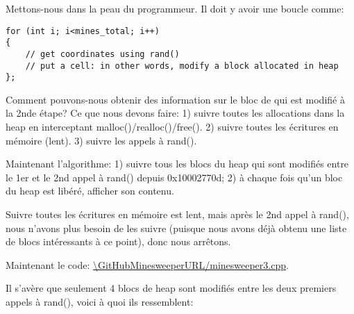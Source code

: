 Mettons-nous dans la peau du programmeur.
Il doit y avoir une boucle comme:

\begin{lstlisting}
for (int i; i<mines_total; i++)
{
	// get coordinates using rand()
	// put a cell: in other words, modify a block allocated in heap
};
\end{lstlisting}

Comment pouvons-nous obtenir des information sur le bloc de qui est modifié à la
2nde étape?
Ce que nous devons faire:
1) suivre toutes les allocations dans la heap en interceptant malloc()/realloc()/free().
2) suivre toutes les écritures en mémoire (lent).
3) suivre les appels à rand().

Maintenant l'algorithme:
1) suivre tous les blocs du heap qui sont modifiés entre le 1er et le 2nd appel à
rand() depuis 0x10002770d;
2) à chaque fois qu'un bloc du heap est libéré, afficher son contenu.

Suivre toutes les écritures en mémoire est lent, mais après le 2nd appel à rand(),
nous n'avons plus besoin de les suivre (puisque nous avons déjà obtenu une liste
de blocs intéressants à ce point), donc nous arrêtons.

Maintenant le code: \url{\GitHubMinesweeperURL/minesweeper3.cpp}.

Il s'avère que seulement 4 blocs de heap sont modifiés entre les deux premiers appels
à rand(), voici à quoi ils ressemblent:

